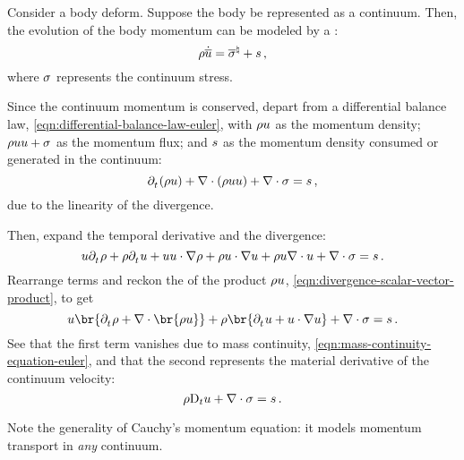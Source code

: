 \begin{model}
  Consider a body deform. Suppose the body be represented as a continuum. Then, the evolution of the body momentum can be modeled by a :
  \begin{equation}\label{eqn:cauchy-momentum-equation-lagrange}
    \rho\dot{\overline{u}} = {\overline{\sigma}}^{\natural} + s\,,
  \end{equation}
  where $\sigma$ represents the continuum stress.
\end{model}
%
\begin{argument}
  Since the continuum momentum is conserved, depart from a differential balance law, \cref{eqn:differential-balance-law-euler}, with $\rho u$ as the momentum density; $\rho uu + \sigma$ as the momentum flux; and $s$ as the momentum density consumed or generated in the continuum:
  \begin{equation*}
    \cpd t\vat{\dens\vel} + \odiv\vat{\dens\vel\vel} + \odiv\stress
    = \ssink\,,
  \end{equation*}
  due to the linearity of the divergence.

  Then, expand the temporal derivative and the divergence:
  \begin{equation*}
    \vel\cpd t\dens + \dens\cpd t\vel
    + \vel\vel\iprod\ograd\dens + \dens\vel\iprod\ograd\vel
    + \dens\vel\odiv\vel
    + \odiv\stress
    = \ssink\,.
  \end{equation*}
  Rearrange terms and reckon the  of the product $\rho u$, \cref{eqn:divergence-scalar-vector-product}, to get
  \begin{equation*}
    \vel\br{\cpd t\dens + \odiv\br{\dens\vel}}
    + \dens\br{\cpd t\vel + \vel\iprod\ograd\vel}
    + \odiv\stress
    = \ssink\,.
  \end{equation*}
  See that the first term vanishes due to mass continuity, \cref{eqn:mass-continuity-equation-euler}, and that the second represents the material derivative of the continuum velocity:
  \begin{equation*}
    \rho\mathrm{D}_{t}u
    + \nabla\cdot\sigma
    = s\,.
  \end{equation*}
\end{argument}
%
Note the generality of Cauchy's momentum equation: it models momentum transport in \emph{any} continuum.
